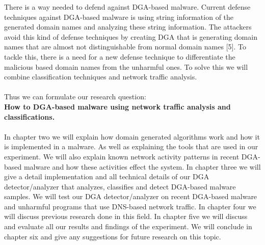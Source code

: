 There is a way needed to defend against DGA-based malware. Current defense techniques against DGA-based malware is using string information of the generated domain names and analyzing these string information. The attackers avoid this kind of defense techniques by creating DGA that is generating domain names that are almost not distinguishable from normal domain names [5]. To tackle this, there is a need for a new defense technique to differentiate the malicious based domain names from the unharmful ones. To solve this we will combine classification techniques and network traffic analysis.\\\\
Thus we can formulate our research question:\\ \textbf{How to DGA-based malware using network traffic analysis and classifications.}\\\\
In chapter two we will explain how domain generated algorithms work and how it is implemented in a malware. As well as explaining the tools that are used in our experiment. We will also explain known network activity patterns in recent DGA-based malware and how these activities effect the system.
In chapter three we will give a detail implementation and all technical details of our DGA detector/analyzer that analyzes, classifies and detect DGA-based malware samples. We will test our DGA detector/analyzer on recent DGA-based malware and unharmful programs that use DNS-based network traffic.
In chapter four we will discuss previous research done in this field.
In chapter five we will discuss and evaluate all our results and findings of the experiment.
We will conclude in chapter six and give any suggestions for future research on this topic.
